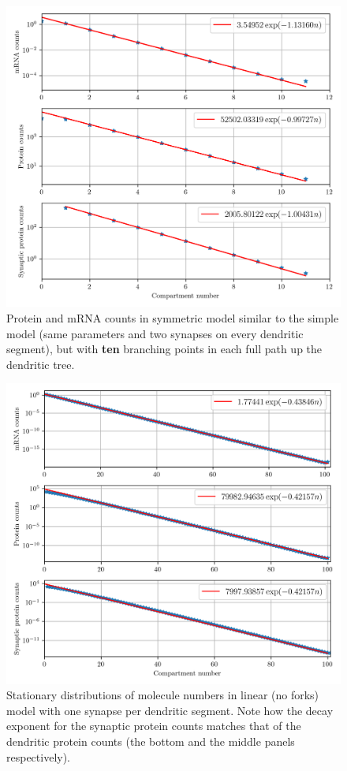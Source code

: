 \documentclass[a4paper, 11pt]{article}
\begin{document}
\begin{figure}
  \begin{center}
    \includegraphics[width=12cm]{img/10_forks_decay_plots.png}
  \end{center}  
  \caption{Protein and mRNA counts in symmetric model similar to the simple model (same parameters and two synapses on every dendritic segment), but with {\bf ten} branching points in each full path up the dendritic tree.}
  \label{10_forks_decay_plots}
\end{figure}

\begin{figure}
  \begin{center}
    \includegraphics[width=12cm]{img/linear_model_decays.png}
  \end{center}  
  \caption{Stationary distributions of molecule numbers in linear (no forks) model with one synapse per dendritic segment. Note how the decay exponent for the synaptic protein counts matches that of the dendritic protein counts (the bottom and the middle panels respectively).}
  \label{fig:linear_model_decays}
\end{figure}
\end{document}
